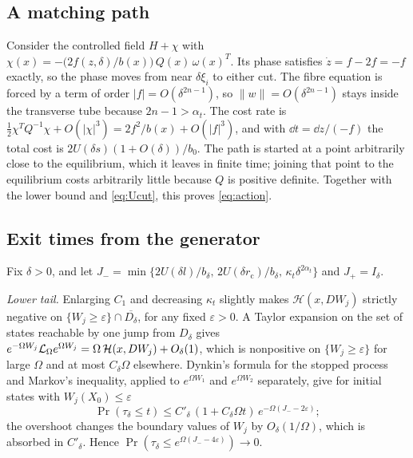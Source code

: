 \subsection{A matching path}
Consider the controlled field \(H+\chi\) with
\(\chi(x)=-\bigl(2f(z,\delta)/b(x)\bigr)\,Q(x)\,\omega(x)^T\). Its phase satisfies
\(\dot z=f-2f=-f\) exactly, so the phase moves from near \(\delta\xi_i\) to either cut. The
fibre equation is forced by a term of order \(|f|=O(\delta^{2n-1})\), so
\(\|w\|=O(\delta^{2n-1})\) stays inside the transverse tube because \(2n-1>\alpha_t\). The cost
rate is \(\tfrac12\chi^TQ^{-1}\chi+O(|\chi|^3)=2f^2/b(x)+O(|f|^3)\), and with
\(\dd t=\dd z/(-f)\) the total cost is \(2U(\delta s)(1+O(\delta))/b_0\). The path is started at
a point arbitrarily close to the equilibrium, which it leaves in finite time; joining that
point to the equilibrium costs arbitrarily little because \(Q\) is positive definite. Together
with the lower bound and \eqref{eq:Ucut}, this proves \eqref{eq:action}.

\subsection{Exit times from the generator}
Fix \(\delta>0\), and let \(J_-=\min\{2U(\delta l)/b_\delta,\,2U(\delta r_{\mathrm c})/b_\delta,\,
\kappa_t\delta^{2\alpha_t}\}\) and \(J_+=I_\delta\).

\emph{Lower tail.} Enlarging \(C_1\) and decreasing \(\kappa_t\) slightly makes
\(\mathcal H(x,DW_j)\) strictly negative on \(\{W_j\ge\varepsilon\}\cap\overline{D_\delta}\),
for any fixed \(\varepsilon>0\). A Taylor expansion on the set of states reachable by one jump
from \(D_\delta\) gives
\(e^{-\Omega W_j}\mathcal L_\Omega e^{\Omega W_j}=\Omega\,\mathcal H(x,DW_j)+O_\delta(1)\), which is
nonpositive on \(\{W_j\ge\varepsilon\}\) for large \(\Omega\) and at most
\(C_\delta\Omega\) elsewhere. Dynkin's formula for the stopped process and Markov's
inequality, applied to \(e^{\Omega W_1}\) and \(e^{\Omega W_2}\) separately, give for initial
states with \(W_j(X_0)\le\varepsilon\)
\begin{equation}\label{eq:exitlower}
 \Pr(\tau_\delta\le t)\le C'_\delta\,(1+C_\delta\Omega t)\,e^{-\Omega(J_--2\varepsilon)};
\end{equation}
the overshoot changes the boundary values of \(W_j\) by \(O_\delta(1/\Omega)\), which is
absorbed in \(C'_\delta\). Hence \(\Pr(\tau_\delta\le e^{\Omega(J_--4\varepsilon)})\to0\).

